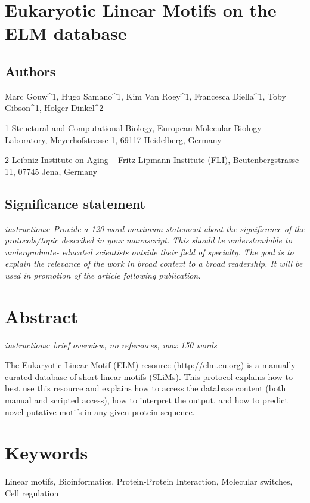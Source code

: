 \section{Eukaryotic Linear Motifs on the ELM
database}\label{eukaryotic-linear-motifs-on-the-elm-database}

\subsection{Authors}\label{authors}

Marc Gouw\^{}1, Hugo Samano\^{}1, Kim Van Roey\^{}1, Francesca
Diella\^{}1, Toby Gibson\^{}1, Holger Dinkel\^{}2

1 Structural and Computational Biology, European Molecular Biology
Laboratory, Meyerhofstrasse 1, 69117 Heidelberg, Germany

2 Leibniz-Institute on Aging -- Fritz Lipmann Institute (FLI),
Beutenbergstrasse 11, 07745 Jena, Germany

\subsection{Significance statement}\label{significance-statement}

\emph{instructions: Provide a 120-word-maximum statement about the
significance of the protocols/topic described in your manuscript. This
should be understandable to undergraduate- educated scientists outside
their field of specialty. The goal is to explain the relevance of the
work in broad context to a broad readership. It will be used in
promotion of the article following publication.}

\section{Abstract}\label{abstract}

\emph{instructions: brief overview, no references, max 150 words}

The Eukaryotic Linear Motif (ELM) resource (http://elm.eu.org) is a
manually curated database of short linear motifs (SLiMs). This protocol
explains how to best use this resource and explains how to access the
database content (both manual and scripted access), how to interpret the
output, and how to predict novel putative motifs in any given protein
sequence.

\section{Keywords}\label{keywords}

Linear motifs, Bioinformatics, Protein-Protein Interaction, Molecular
switches, Cell regulation

